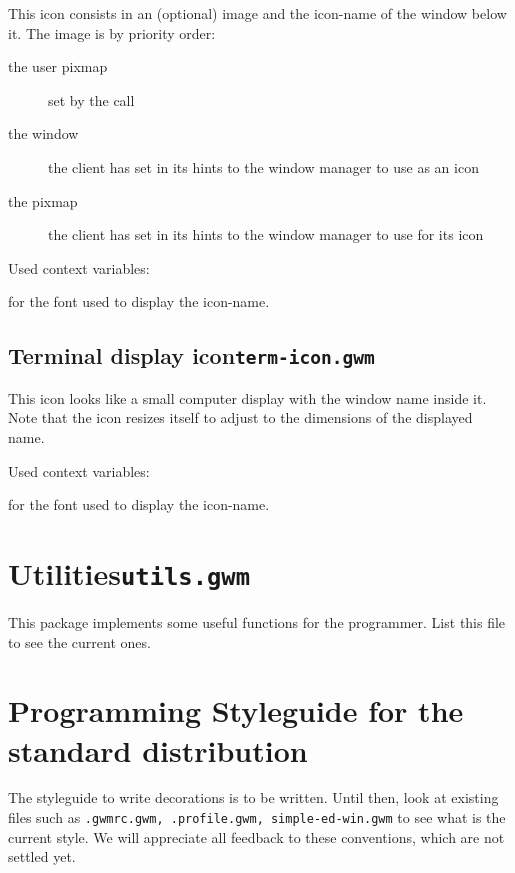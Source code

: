 This icon consists in an (optional) image and the icon-name of the
window below it. The image is by priority order:

\begin{description}
\item[the user pixmap] set by the  call
\item[the window] the client has set in its hints to the window manager to
use as an icon
\item[the pixmap] the client has set in its hints to the window manager to
use for its icon
\end{description}

Used context variables:

\begin{description}
 for the font used to display the icon-name.
\end{description}

\subsection{Terminal display icon\hfill{\tt term-icon.gwm}}
\label{term-icon}

\centerline{\hfil
{}\hfil
{}\hfil}

This icon looks like a small computer display with the window name inside
it. Note that the icon resizes itself to adjust to the dimensions of the
displayed name.

Used context variables:

\begin{description}
 for the font used to display the icon-name.
\end{description}

\section{Utilities\hfill{\tt utils.gwm}}
\label{utils}

This package implements some useful functions for the {\WOOL} programmer.
List this file to see the current ones.

\section{Programming Styleguide for the standard distribution}
\label{standard-styleguide}

The styleguide to write decorations is to be written. Until then, look at
existing files such as {\tt .gwmrc.gwm, .profile.gwm, simple-ed-win.gwm} to
see what is the current style. We will appreciate all feedback to these
conventions, which are not settled yet.

